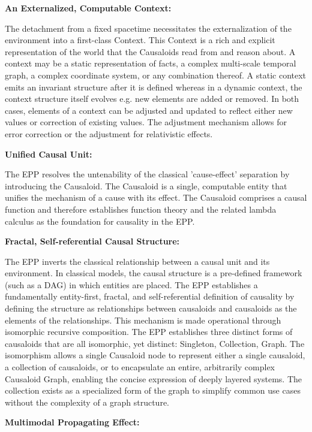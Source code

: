 \textbf{An Externalized, Computable Context:} 

The detachment from a fixed spacetime necessitates the externalization of the environment into a first-class Context. This Context is a rich and explicit representation of the world that the Causaloids read from and reason about. A context may be a static representation of facts, a complex multi-scale temporal graph, a complex coordinate system, or any combination thereof. A static context emits an invariant structure after it is defined whereas in a dynamic context, the context structure itself evolves e.g. new elements are added or removed. In both cases, elements of a context can be adjusted and updated to reflect either new values or correction of existing values. The adjustment mechanism allows for error correction or the adjustment for relativistic effects.   

 \textbf{Unified Causal Unit:} 
 
 The EPP resolves the untenability of the classical 'cause-effect' separation by introducing the Causaloid. The Causaloid is a single, computable entity that unifies the mechanism of a cause with its effect. The Causaloid comprises a causal function and therefore establishes function theory and the related lambda calculus as the foundation for causality in the EPP. 

\textbf{Fractal, Self-referential Causal Structure:} 

The EPP inverts the classical relationship between a causal unit and its environment. In classical models, the causal structure is a pre-defined framework (such as a DAG) in which entities are placed. The EPP establishes a fundamentally entity-first, fractal, and self-referential definition of causality by defining the structure as relationships between causaloids and causaloids as the elements of the relationships. This mechanism is made operational through isomorphic recursive composition. The EPP establishes three distinct forms of causaloids that are all isomorphic, yet distinct: Singleton, Collection, Graph.  The isomorphism allows a single Causaloid node to represent either a single causaloid, a collection of causaloids, or to encapsulate an entire, arbitrarily complex Causaloid Graph, enabling the concise expression of deeply layered systems. The collection exists as a specialized form of the graph to simplify common use cases without the complexity of a graph structure. 


\textbf{Multimodal Propagating Effect:}
  
